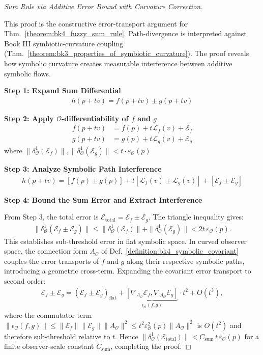 \begin{proof}[Sum Rule via Additive Error Bound with Curvature Correction]
\label{proof:bk4_sketch_symbolic_path_interference}
\leavevmode

This proof is the constructive error-transport argument for
Thm.~\ref{theorem:bk4_fuzzy_sum_rule}. Path-divergence is interpreted
against Book III symbiotic-curvature coupling
(Thm.~\ref{theorem:bk3_properties_of_symbiotic_curvature}).
The proof reveals how symbolic curvature creates measurable interference between
additive symbolic flows.

\textbf{Step 1: Expand Sum Differential}
\begin{align}
h(p + tv) = f(p + tv) \pm g(p + tv)
\end{align}

\textbf{Step 2: Apply $\mathcal{O}$-differentiability of $f$ and $g$}
\begin{align}
f(p + tv) &= f(p) + t\mathcal{L}_f(v) + \mathcal{E}_f \\
g(p + tv) &= g(p) + t\mathcal{L}_g(v) + \mathcal{E}_g
\end{align}
where $\|\delta^1_{\mathcal{O}}(\mathcal{E}_f)\|, \|\delta^1_{\mathcal{O}}(\mathcal{E}_g)\| < t \cdot \varepsilon_{\mathcal{O}}(p)$

\textbf{Step 3: Analyze Symbolic Path Interference}
\begin{align}
h(p + tv) = [f(p) \pm g(p)] + t[\mathcal{L}_f(v) \pm \mathcal{L}_g(v)] + [\mathcal{E}_f \pm \mathcal{E}_g]
\end{align}

\textbf{Step 4: Bound the Sum Error and Extract Interference}

From Step 3, the total error is $\mathcal{E}_{\text{total}} = \mathcal{E}_f \pm \mathcal{E}_g$. The triangle inequality gives:
\begin{align}
\|\delta^1_{\mathcal{O}}(\mathcal{E}_f \pm \mathcal{E}_g)\| \leq \|\delta^1_{\mathcal{O}}(\mathcal{E}_f)\| + \|\delta^1_{\mathcal{O}}(\mathcal{E}_g)\| < 2t\,\varepsilon_{\mathcal{O}}(p).
\end{align}
This establishes sub-threshold error in flat symbolic space. In curved observer space, the connection form $A_{\mathcal{O}}$ of Def.~\ref{definition:bk4_symbolic_covariant} couples the error transports of $f$ and $g$ along their respective symbolic paths, introducing a geometric cross-term. Expanding the covariant error transport to second order:
\begin{align}
\mathcal{E}_f \pm \mathcal{E}_g = (\mathcal{E}_f \pm \mathcal{E}_g)_{\text{flat}} + \underbrace{[\nabla_{A_{\mathcal{O}}} \mathcal{E}_f, \nabla_{A_{\mathcal{O}}} \mathcal{E}_g]}_{\epsilon_{\mathcal{O}}(f,g)} \cdot t^2 + O(t^3),
\end{align}
where the commutator term $\|\epsilon_{\mathcal{O}}(f,g)\| \leq \|\mathcal{E}_f\|\|\mathcal{E}_g\|\|A_{\mathcal{O}}\|^2 \leq t^2\varepsilon_{\mathcal{O}}^2(p)\|A_{\mathcal{O}}\|^2$ is $O(t^2)$ and therefore sub-threshold relative to $t$. Hence $\|\delta^1_{\mathcal{O}}(\mathcal{E}_{\text{total}})\| < C_{\text{sum}}\,t\,\varepsilon_{\mathcal{O}}(p)$ for a finite observer-scale constant $C_{\text{sum}}$, completing the proof.
\end{proof}

